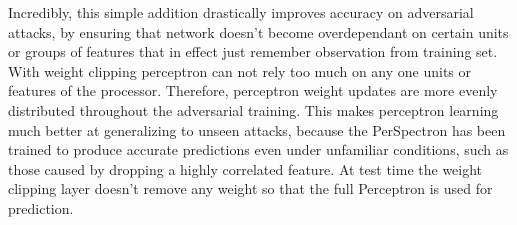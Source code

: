 Incredibly, this simple addition drastically improves accuracy on adversarial attacks, by ensuring that network doesn't become overdependant on certain units or groups of features that in effect just remember observation from training set. With weight clipping perceptron can not rely too much on any one units or features of the processor. Therefore, perceptron weight updates are more evenly distributed throughout the adversarial training. This makes perceptron learning much better at generalizing to unseen attacks, because the PerSpectron has been trained to produce accurate predictions even under unfamiliar conditions, such as those caused by dropping a highly correlated feature. At test time the weight clipping layer doesn't remove any weight so that the full Perceptron is used for prediction. 
